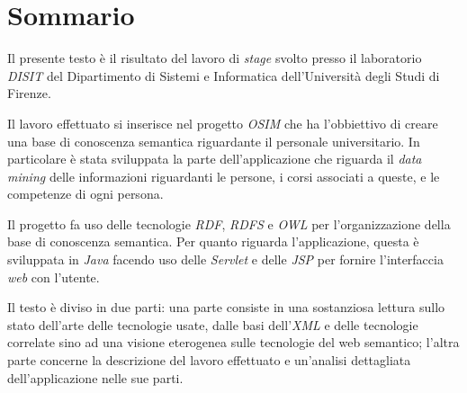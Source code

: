 \begingroup
\let\clearpage\relax
\let\cleardoublepage\relax
\let\cleardoublepage\relax

\chapter*{Sommario}
Il presente testo \`e il risultato del lavoro di \emph{stage} svolto
presso il laboratorio \emph{DISIT} del Dipartimento di Sistemi e
Informatica dell'Universit\`a degli Studi di Firenze.

Il lavoro effettuato si inserisce nel progetto \emph{OSIM} che ha
l'obbiettivo di creare una base di conoscenza semantica riguardante il
personale universitario. In particolare \`e
stata sviluppata la parte dell'applicazione che riguarda il \emph{data
mining} delle informazioni riguardanti le persone, i corsi associati a
queste, e le competenze di ogni persona.

Il progetto fa uso delle
tecnologie \emph{RDF}, \emph{RDFS} e \emph{OWL} per l'organizzazione
della base di conoscenza semantica. Per quanto riguarda
l'applicazione, questa \`e sviluppata in \emph{Java} facendo uso delle
\emph{Servlet} e delle \emph{JSP} per fornire l'interfaccia \emph{web}
con l'utente.

Il testo \`e diviso in due parti: una parte consiste in una
sostanziosa lettura sullo stato dell'arte delle tecnologie usate,
dalle basi dell'\emph{XML} e delle tecnologie correlate sino ad una
visione eterogenea sulle tecnologie del web semantico;
l'altra parte concerne la descrizione del lavoro effettuato e un'analisi
dettagliata dell'applicazione nelle sue parti.

\endgroup			

\vfill
